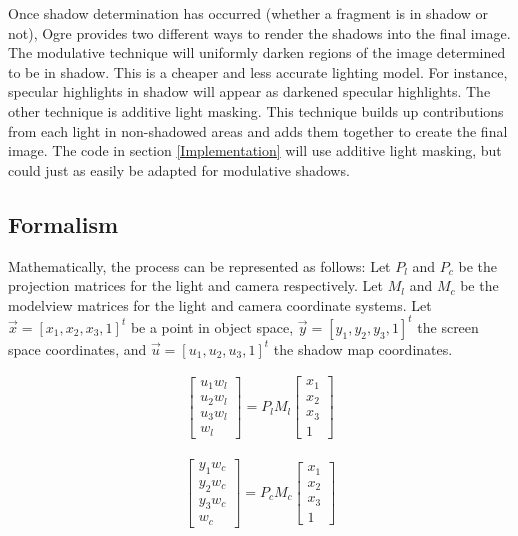 \documentclass[]{article}  %
\begin{document}
Once shadow determination has occurred (whether a fragment is in shadow or not), Ogre provides two different ways to render the shadows into the final image.  The modulative technique will uniformly darken regions of the image determined to be in shadow.  This is a cheaper and less accurate lighting model.  For instance, specular highlights in shadow will appear as darkened specular highlights.  The other technique is additive light masking.  This technique builds up contributions from each light in non-shadowed areas and adds them together to create the final image.  The code in section \ref{Implementation} will use additive light masking, but could just as easily be adapted for modulative shadows.

\subsection{Formalism}

Mathematically, the process can be represented as follows: Let $P_l$ and $P_c$ be the projection matrices for the light and camera respectively.  Let $M_l$ and $M_c$ be the modelview matrices for the light and camera coordinate systems.  Let $\vec{x} = [x_1,x_2,x_3,1]^t$ be a point in object space, $\vec{y} = [y_1,y_2,y_3,1]^t$ the screen space coordinates, and $\vec{u} = [u_1,u_2,u_3,1]^t$ the shadow map coordinates.  

\begin{eqnarray}
\label{eqn:hom}
    \left[ \begin{array}{c}
		u_1  w_l \\
		u_2  w_l \\
		u_3  w_l \\
		w_l     \end{array} \right] =  P_l M_l \left[ \begin{array}{c}
		x_1 \\
		x_2 \\
		x_3 \\
		1     \end{array} \right]
\end{eqnarray}

\begin{eqnarray}
\label{eqn:hom}
    \left[ \begin{array}{c}
		y_1  w_c \\
		y_2  w_c \\
		y_3  w_c \\
		w_c     \end{array} \right] =  P_c M_c \left[ \begin{array}{c}
		x_1 \\
		x_2 \\
		x_3 \\
		1     \end{array} \right]
\end{eqnarray}
\end{document}
